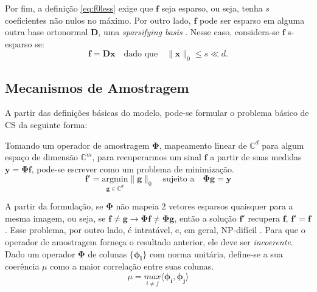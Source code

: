\documentclass[cic,tc]{iiufrgs}
\renewcommand{\vec}[1]{\bm{#1}}
\begin{document}
Por fim, a definição \eqref{eq:f0less} exige que $\vec{f}$ seja esparso, ou seja, tenha $s$ coeficientes não nulos
no máximo. Por outro lado, $\vec{f}$ pode ser esparso em alguma outra base ortonormal $\mathbf{D}$, uma \textit{sparsifying basis} 
\cite{CandesDecoLinear}. Nesse caso, considera-se $\vec{f}$ s-esparso se:
\begin{equation}
    \vec{f} = \mathbf{D}\vec{x} \hspace{1em} \text{dado que} \hspace{1em} \lVert \vec{x} \rVert_0 \le s \ll d.
\end{equation}


\subsection{Mecanismos de Amostragem}
A partir das definições básicas do modelo, pode-se formular o problema básico de CS da seguinte forma:

Tomando um operador de amostragem $\mathbf{\Phi}$, mapeamento linear de $\mathbb{C}^d$ para algum espaço de dimensão 
$\mathbb{C}^m$, para recuperarmos um sinal $\vec{f}$ a partir de suas medidas $\vec{y} = \mathbf{\Phi} \vec{f}$, pode-se escrever
como um problema de minimização.
\begin{equation}
    \label{eq:problem}
    \vec{f}' = \underset{\vec{g} \in \mathbb{C}^d}{\text{argmin}} \lVert \vec{g} \rVert_0 \hspace{1em} \text{sujeito a} \hspace{1em}
    \mathbf{\Phi} \vec{g} = \vec{y} 
\end{equation}

A partir da formulação, se $\mathbf{\Phi}$ não mapeia 2 vetores esparsos quaisquer para a mesma imagem, ou seja,
se $\vec{f} \ne \vec{g} \rightarrow \mathbf{\Phi}\vec{f} \ne \mathbf{\Phi}\vec{g} $, então a solução $\vec{f}'$ recupera
$\vec{f}$, $\vec{f}' = \vec{f}$ \cite{chen2015compressed}. Esse problema, por outro lado, é intratável, e, em geral,
NP-difícil \cite{Mut05}.
Para que o operador de amostragem forneça o resultado anterior, ele deve ser \textit{incoerente}.
Dado um operador $\mathbf{\Phi}$ de colunas $\{ \vec{\phi_i} \}$  com norma unitária, define-se a sua coerência $\mu$
como a maior correlação entre suas colunas.
\begin{equation}
    \label{eq:coerence}
    \mu = \underset{i \ne j}{max}\langle \vec{\phi_i} , \vec{\phi_j} \rangle
\end{equation}
\end{document}
